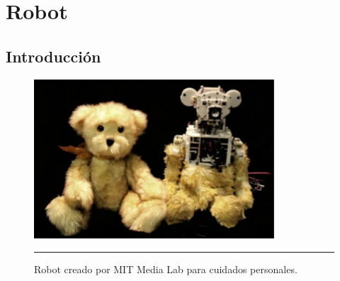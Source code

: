 


\chapter{Robot} %

\label{Chapter1} %




\section{Introducción}
\begin{figure}[htbp]
	\centering
		\includegraphics[width=0.8\textwidth]{./Figures/robot.jpg}
		\rule{35em}{0.5pt}
	\caption[Robot Huggable]{Robot creado por MIT Media Lab para cuidados personales.}
	\label{fig:Huggable}
\end{figure}

